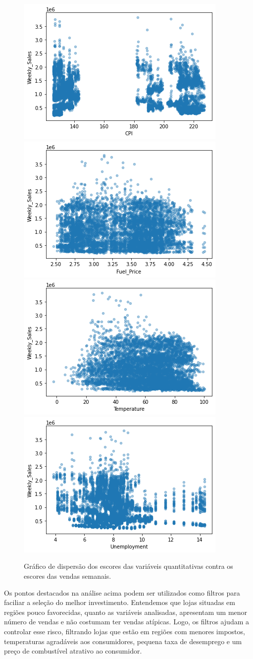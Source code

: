 \documentclass[letterpaper,11pt]{article}
\begin{document}
\begin{figure}[!htb]
  \centering
  \includegraphics[width=.49\linewidth]{cpi.png}
  \label{fig:sfig1}
  \includegraphics[width=.49\linewidth]{fuel_price.png}
  \label{fig:sfig2}
  \includegraphics[width=.49\linewidth]{temperature.png}
  \label{fig:sfig2}
  \includegraphics[width=.49\linewidth]{unemployment.png}
  \label{fig:sfig2}
  \caption{Gráfico de dispersão dos escores das variáveis quantitativas contra os escores das vendas semanais.}
\label{fig:uu}
\end{figure}

Os pontos destacados na análise acima podem ser utilizados como filtros para faciliar a seleção do melhor investimento. Entendemos que lojas situadas em regiões pouco favorecidas, quanto as variáveis analisadas, apresentam um menor número de vendas e não costumam ter vendas atípicas. Logo, os filtros ajudam a controlar esse risco, filtrando lojas que estão em regiões com menores impostos, temperaturas agradáveis aos consumidores, pequena taxa de desemprego e um preço de combustível atrativo ao consumidor.
\end{document}
